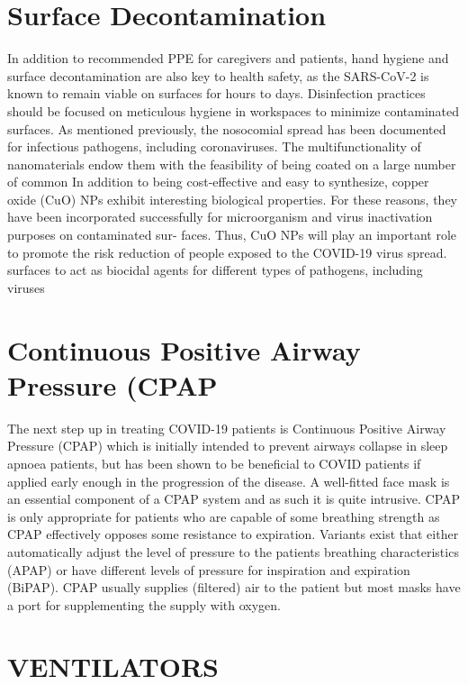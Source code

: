 \documentclass[12pt]{article}
\begin{document}
\section{Surface Decontamination}

In addition to recommended PPE for caregivers and patients, hand hygiene and
surface decontamination are also key to health safety, as the SARS-CoV-2 is known
to remain viable on surfaces for hours to days. Disinfection practices should be
focused on meticulous hygiene in workspaces to minimize contaminated surfaces.
As mentioned previously, the nosocomial spread has been documented for infectious
pathogens, including coronaviruses. The multifunctionality of nanomaterials endow
them with the feasibility of being coated on a large number of common In addition
to being cost-effective and easy to synthesize, copper oxide (CuO) NPs exhibit 
interesting biological properties. For these reasons, they have been incorporated
successfully for microorganism and virus inactivation purposes on contaminated sur-
faces. Thus, CuO NPs will play an important role to promote the risk reduction
of people exposed to the COVID-19 virus spread. surfaces to act as biocidal agents for
different types of pathogens, including viruses

\section{ Continuous Positive Airway Pressure (CPAP}

The next step up in treating COVID-19 patients is Continuous Positive
Airway Pressure (CPAP) which is initially intended to prevent airways
collapse in sleep apnoea patients, but has been shown to be beneficial to
COVID patients if applied early enough in the progression of the disease.
A well-fitted face mask is an essential component of a CPAP system and
as such it is quite intrusive. CPAP is only appropriate for patients who
are capable of some breathing strength as CPAP effectively opposes some
resistance to expiration. Variants exist that either automatically adjust the
level of pressure to the patients breathing characteristics (APAP) or have
different levels of pressure for inspiration and expiration (BiPAP). CPAP
usually supplies (filtered) air to the patient but most masks have a port for
supplementing the supply with oxygen.




\section{VENTILATORS}
\end{document}
